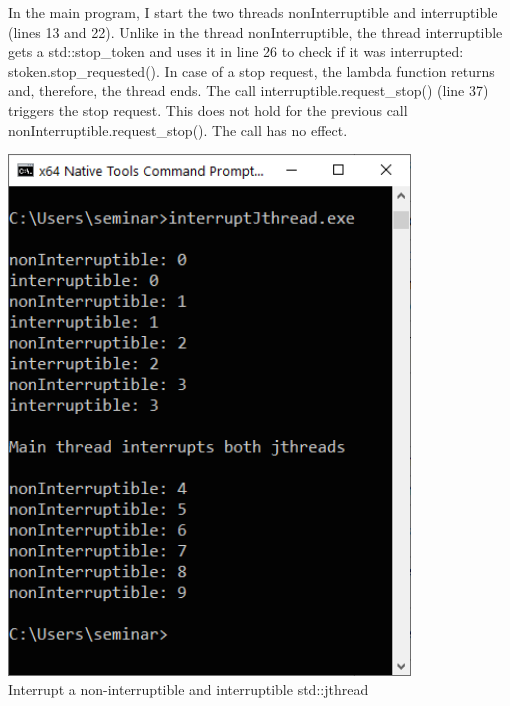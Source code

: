 In the main program, I start the two threads nonInterruptible and interruptible (lines 13 and 22). Unlike in the thread nonInterruptible, the thread interruptible gets a std::stop\_token and uses it in line 26 to check if it was interrupted: stoken.stop\_requested(). In case of a stop request, the lambda function returns and, therefore, the thread ends. The call interruptible.request\_stop() (line 37) triggers the stop request. This does not hold for the previous call nonInterruptible.request\_stop(). The call has no effect.

\begin{center}
\includegraphics[width=0.8\textwidth]{content/3/chapter6/images/27.png}\\
Interrupt a non-interruptible and interruptible std::jthread
\end{center}



























